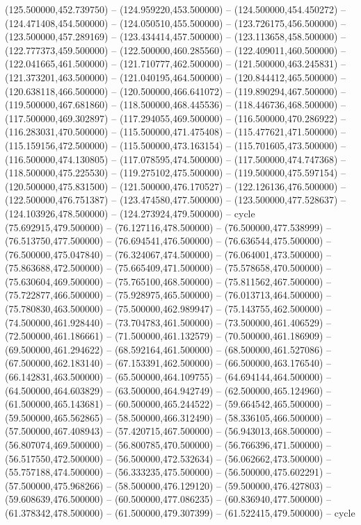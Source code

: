 (125.500000,452.739750) -- (124.959220,453.500000) -- (124.500000,454.450272) -- (124.471408,454.500000) -- (124.050510,455.500000) -- (123.726175,456.500000) -- (123.500000,457.289169) -- (123.434414,457.500000) -- (123.113658,458.500000) -- (122.777373,459.500000) -- (122.500000,460.285560) -- (122.409011,460.500000) -- (122.041665,461.500000) -- (121.710777,462.500000) -- (121.500000,463.245831) -- (121.373201,463.500000) -- (121.040195,464.500000) -- (120.844412,465.500000) -- (120.638118,466.500000) -- (120.500000,466.641072) -- (119.890294,467.500000) -- (119.500000,467.681860) -- (118.500000,468.445536) -- (118.446736,468.500000) -- (117.500000,469.302897) -- (117.294055,469.500000) -- (116.500000,470.286922) -- (116.283031,470.500000) -- (115.500000,471.475408) -- (115.477621,471.500000) -- (115.159156,472.500000) -- (115.500000,473.163154) -- (115.701605,473.500000) -- (116.500000,474.130805) -- (117.078595,474.500000) -- (117.500000,474.747368) -- (118.500000,475.225530) -- (119.275102,475.500000) -- (119.500000,475.597154) -- (120.500000,475.831500) -- (121.500000,476.170527) -- (122.126136,476.500000) -- (122.500000,476.751387) -- (123.474580,477.500000) -- (123.500000,477.528637) -- (124.103926,478.500000) -- (124.273924,479.500000) -- cycle
   (75.692915,479.500000) -- (76.127116,478.500000) -- (76.500000,477.538999) -- (76.513750,477.500000) -- (76.694541,476.500000) -- (76.636544,475.500000) -- (76.500000,475.047840) -- (76.324067,474.500000) -- (76.064001,473.500000) -- (75.863688,472.500000) -- (75.665409,471.500000) -- (75.578658,470.500000) -- (75.630604,469.500000) -- (75.765100,468.500000) -- (75.811562,467.500000) -- (75.722877,466.500000) -- (75.928975,465.500000) -- (76.013713,464.500000) -- (75.780830,463.500000) -- (75.500000,462.989947) -- (75.143755,462.500000) -- (74.500000,461.928440) -- (73.704783,461.500000) -- (73.500000,461.406529) -- (72.500000,461.186661) -- (71.500000,461.132579) -- (70.500000,461.186909) -- (69.500000,461.294622) -- (68.592164,461.500000) -- (68.500000,461.527086) -- (67.500000,462.183140) -- (67.153391,462.500000) -- (66.500000,463.176540) -- (66.142831,463.500000) -- (65.500000,464.109755) -- (64.694144,464.500000) -- (64.500000,464.603829) -- (63.500000,464.942749) -- (62.500000,465.124960) -- (61.500000,465.143681) -- (60.500000,465.244522) -- (59.664542,465.500000) -- (59.500000,465.562865) -- (58.500000,466.312490) -- (58.336105,466.500000) -- (57.500000,467.408943) -- (57.420715,467.500000) -- (56.943013,468.500000) -- (56.807074,469.500000) -- (56.800785,470.500000) -- (56.766396,471.500000) -- (56.517550,472.500000) -- (56.500000,472.532634) -- (56.062662,473.500000) -- (55.757188,474.500000) -- (56.333235,475.500000) -- (56.500000,475.602291) -- (57.500000,475.968266) -- (58.500000,476.129120) -- (59.500000,476.427803) -- (59.608639,476.500000) -- (60.500000,477.086235) -- (60.836940,477.500000) -- (61.378342,478.500000) -- (61.500000,479.307399) -- (61.522415,479.500000) -- cycle
